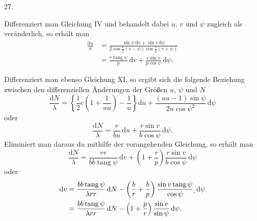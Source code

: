 \par{}
\begin{center}
\hypertarget{native-043-article027}{}27.
\end{center}
Differenziert man Gleichung IV und behandelt dabei $u$, $v$ und $\psi$ zugleich als veränderlich, so erhält man
\[
\begin{aligned}
\frac{\mathrm{d}u}{u}&=\frac{\sin\psi\,\mathrm{d}v+\sin v\,\mathrm{d}\psi}{2\cos\frac{1}{2}(v-\psi)\cos\frac{1}{2}(v+\psi)}\\
&=\frac{r\operatorname{tang}\psi}{p}\,\mathrm{d}v+\frac{r\sin v}{p\cos\psi}\,\mathrm{d}\psi.
\end{aligned}
\]

Differenziert man ebenso Gleichung XI, so ergibt sich die folgende Beziehung zwischen den differenziellen Änderungen der Größen $u$, $\psi$ und $N$
\[
\frac{\mathrm{d}N}{\lambda}=\left\{\frac{1}{2}e\left(1+\frac{1}{uu}\right)-\frac{1}{u}\right\}\mathrm{d}u+\frac{(uu-1)\sin\psi}{2u\cos\psi^2}\,\mathrm{d}\psi
\]
oder
\[
\frac{\mathrm{d}N}{\lambda}=\frac{r}{bu}\,\mathrm{d}u+\frac{r\sin v}{b\cos\psi}\,\mathrm{d}\psi.
\]
Eliminiert man daraus $\mathrm{d}u$ mithilfe der vorangehenden Gleichung, so erhält man
\[
\frac{\mathrm{d}N}{\lambda}=\frac{rr}{bb\operatorname{tang}\psi}\,\mathrm{d}v+\left(1+\frac{r}{p}\right)\frac{r\sin v}{b\cos\psi}\,\mathrm{d}\psi
\]
oder
\[
\begin{aligned}
\mathrm{d}v&=\frac{bb\operatorname{tang}\psi}{\lambda rr}\,\mathrm{d}N-\left(\frac{b}{r}+\frac{b}{p}\right)\frac{\sin v\operatorname{tang}\psi}{\cos\psi}\raisebox{-.6ex}{.}\,\mathrm{d}\psi\\
&=\frac{bb\operatorname{tang}\psi}{\lambda rr}\,\mathrm{d}N-\left(1+\frac{p}{r}\right)\frac{\sin v}{\sin\psi}\,\mathrm{d}\psi.
\end{aligned}
\]

